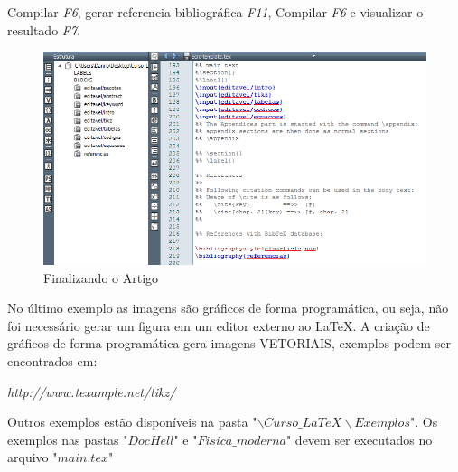 \begin{frame}[fragile]
Compilar \textit{F6}, gerar referencia bibliográfica \textit{F11},  Compilar \textit{F6} e visualizar o resultado \textit{F7}.
\begin{figure}
\begin{center}
\includegraphics[scale=.5]{figuras/fig5}
\caption{Finalizando o Artigo}
\end{center}
\end{figure}
\end{frame}



\begin{frame}
No último exemplo as imagens são gráficos de forma programática, ou seja,
não foi necessário gerar um figura em um editor externo ao \LaTeX.
A criação de gráficos de forma programática gera imagens VETORIAIS, exemplos podem ser encontrados em:

\vspace*{0.5cm}
\begin{center}
\textit{http://www.texample.net/tikz/}
\end{center}
\vspace*{0.5cm}

Outros exemplos estão disponíveis na pasta "$\backslash Curso\_ LaTeX \backslash Exemplos$". 
Os exemplos nas pastas "$DocHell$" e "$Fisica\_moderna$" devem ser executados no arquivo "$main.tex$"
\end{frame}


